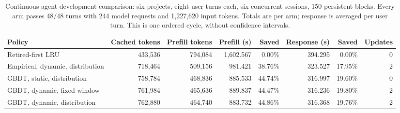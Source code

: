 \begin{table}[t]
\centering\small
\caption{Continuous-agent development comparison: six projects, eight user turns each, six concurrent sessions, 150 persistent blocks. Every arm passes 48/48 turns with 244 model requests and 1,227,620 input tokens. Totals are per arm; response is averaged per user turn. This is one ordered cycle, without confidence intervals.}
\label{tab:continuous-e2e}
\setlength{\tabcolsep}{4pt}
\begin{tabular}{@{}lrrrrrrr@{}}
\toprule
Policy & Cached tokens & Prefill tokens & Prefill (s) & Saved & Response (s) & Saved & Updates \\
\midrule
Retired-first LRU & 433,536 & 794,084 & 1,602.567 & 0.00\% & 394.295 & 0.00\% & 0 \\
Empirical, dynamic, distribution & 718,464 & 509,156 & 981.421 & 38.76\% & 323.527 & 17.95\% & 2 \\
GBDT, static, distribution & 758,784 & 468,836 & 885.533 & 44.74\% & 316.997 & 19.60\% & 0 \\
GBDT, dynamic, fixed window & 761,984 & 465,636 & 889.837 & 44.47\% & 316.236 & 19.80\% & 2 \\
GBDT, dynamic, distribution & 762,880 & 464,740 & 883.732 & 44.86\% & 316.368 & 19.76\% & 2 \\
\bottomrule
\end{tabular}
\end{table}
